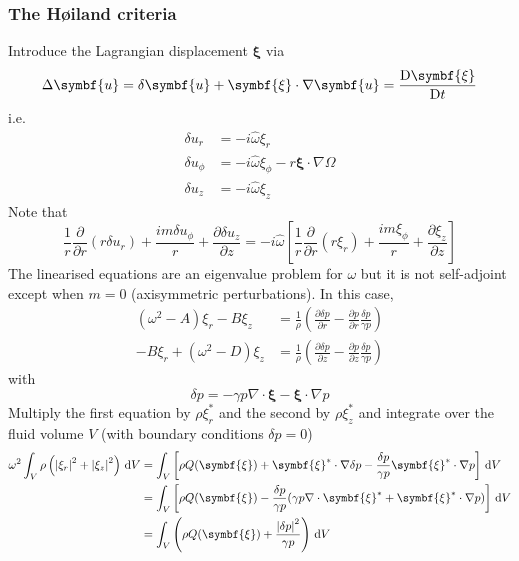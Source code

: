\documentclass{jknotes}
\renewcommand{\u}{\symbf{u}}
\newcommand{\disp}{\symbf{\xi}}
\begin{document}
\subsubsection{The H\o iland criteria}
Introduce the Lagrangian displacement $\disp$ via
\begin{equation}
	\Delta \u = \delta \u + \disp \cdot \nabla \u = \frac{\diffD \disp}{\diffD
	t}
\end{equation}
i.e.
\begin{align}
	\delta u_r &= -i\hat{\omega} \xi_r \\
	\delta u_\phi &= -i\hat{\omega}\xi_\phi - r\disp \cdot \nabla \Omega \\
	\delta u_z &= -i\hat{\omega} \xi_z 
\end{align}
Note that
\begin{equation}
	\frac{1}{r}\frac{\partial}{\partial r}(r\delta u_r) + \frac{im\delta
	u_\phi}{r} + \frac{\partial \delta u_z}{\partial z} =
	-i\hat{\omega}\left[\frac{1}{r}\frac{\partial}{\partial r}(r\xi_r) +
	\frac{im\xi_\phi}{r} + \frac{\partial \xi_z}{\partial z} \right]
\end{equation}
The linearised equations are an eigenvalue problem for $\omega$ but it is not
self-adjoint except when $m=0$ (axisymmetric perturbations). In this case,
\begin{align}
	(\omega^2 - A)\xi_r - B \xi_z &= \frac{1}{\rho}\left(\frac{\partial \delta
	p}{\partial r} - \frac{\partial p}{\partial r} \frac{\delta p}{\gamma
	p}\right) \\
		-B\xi_r + (\omega^2 - D) \xi_z &= \frac{1}{\rho}\left(\frac{\partial
		\delta p}{\partial z} - \frac{\partial p}{\partial z} \frac{\delta
	p}{\gamma p}\right)
\end{align}
with
\begin{equation}
	\delta p = -\gamma p \nabla \cdot \disp - \disp \cdot \nabla p
\end{equation}
Multiply the first equation by $\rho \xi_r^*$ and the second by $\rho \xi_z^*$
and integrate over the fluid volume $V$ (with boundary conditions $\delta p =
0$)
\begin{align}
	\omega^2 \int_V \rho\left(\abs{\xi_r}^2 + \abs{\xi_z}^2\right) \, \diffd V
	&= \int_V \left[ \rho Q(\disp) + \disp^* \cdot \nabla \delta p -
	\frac{\delta p}{\gamma p} \disp^* \cdot \nabla p \right] \, \diffd V \\
	&= \int_V \left[ \rho Q(\disp) - \frac{\delta p}{\gamma p}(\gamma p \nabla
	\cdot \disp^* + \disp^* \cdot \nabla p)\right] \, \diffd V \\
	&= \int_V \left( \rho Q(\disp) + \frac{\abs{\delta p}^2}{\gamma p} \right)
	\,\diffd V
\end{align}
\end{document}

